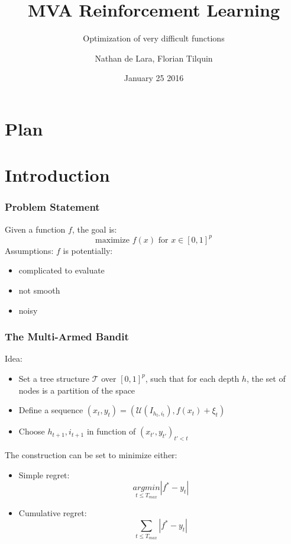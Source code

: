 \documentclass[xcolor={usenames,dvipsnames}]{beamer}
\begin{document}

\title{MVA Reinforcement Learning}
\subtitle{Optimization of very difficult functions}
\author{Nathan de Lara, Florian Tilquin}
\date{January 25 2016}


\begin{frame}
\titlepage
\end{frame}

\usebackgroundtemplate{ }

\section*{Plan}

\section{Introduction}
\begin{frame}
\frametitle{Problem Statement}
Given a function $f$, the goal is:
\begin{equation}
\mbox{maximize } f(x) \mbox{ for } x\in [0,1]^p
\end{equation}
Assumptions: $f$ is potentially:
\begin{itemize}
\item complicated to evaluate
\item not smooth
\item noisy
\end{itemize}
\end{frame}

\begin{frame}
\frametitle{The Multi-Armed Bandit}
Idea:
\begin{itemize}
\item Set a tree structure $\mathcal{T}$ over $[0,1]^p$, such that for each depth $h$, the set of nodes is a partition of the space
\item Define a sequence $(x_t,y_t)=(\mathcal{U}(I_{h_t,i_t}),f(x_t)+\xi_t)$
\item Choose $h_{t+1},i_{t+1}$ in function of $(x_{t'},y_{t'})_{t'<t}$
\end{itemize}
The construction can be set to minimize either:
\begin{itemize}
\item Simple regret: \begin{equation}
\underset{t\le T_{max}}{argmin}|f^*-y_t|
\end{equation}
\item Cumulative regret: \begin{equation}\underset{t\le T_{max}}{\sum}|f^*-y_t| \end{equation}
\end{itemize}
\end{frame}
\end{document}
